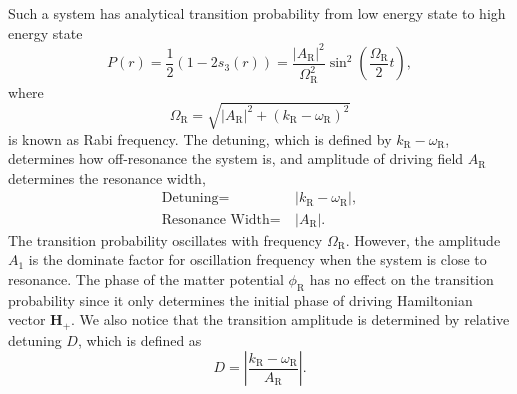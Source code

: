 \documentclass[%
reprint,
 amsmath,amssymb,
 prd,
]{revtex4-1}
\newcommand{\RD}{D}
\begin{document}
Such a system has analytical transition probability from low energy state to high energy state
\begin{equation}
    P(r) = \frac{1}{2}(1- 2 s_3(r))= \frac{\left \lvert A_{\mathrm{R}} \right \rvert ^2}{ \Omega_{\mathrm R}^2 } \sin^2 \left( \frac{\Omega_{\mathrm R}}{2} t \right),
    \label{rabi-system-transition-probability}
\end{equation}
where
\begin{equation}
\Omega_{\mathrm R} = \sqrt{ \lvert A_{\mathrm{R}}\rvert^2 + (k_{\mathrm{R}} - \omega_{\mathrm R})^2 }
\end{equation} is known as Rabi frequency. The detuning, which is defined by $k_{\mathrm{R}} - \omega_{\mathrm R}$, determines how off-resonance the system is, and amplitude of driving field $A_{\mathrm{R}}$ determines the resonance width,
\begin{align}
\text{Detuning} =&~\lvert k_{\mathrm{R}} - \omega_{\mathrm R} \rvert, \\
\text{Resonance Width} =&~\lvert A_{\mathrm R} \rvert.
\end{align}
The transition probability oscillates with frequency $\Omega_{\mathrm R}$. However, the amplitude $A_1$ is the dominate factor for oscillation frequency when the system is close to resonance. The phase of the matter potential $\phi_{\mathrm{R}}$ has no effect on the transition probability since it only determines the initial phase of driving Hamiltonian vector $\mathbf{H}_+$. We also notice that the transition amplitude is determined by relative detuning $\RD$, which is defined as
\begin{equation}
    \RD = \left\lvert \frac{ k_{\mathrm R} - \omega_{\mathrm R}}{A_{\mathrm R}} \right\rvert.
\end{equation}
\end{document}
